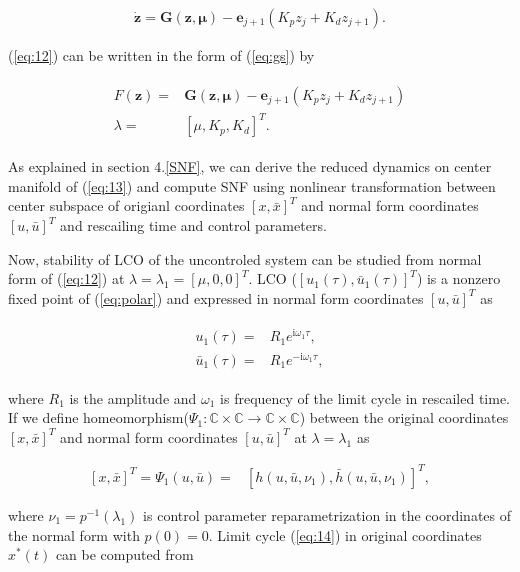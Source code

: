 \documentclass[openacc]{rsproca_new}%
\def\complex{\mathbb{C}}
\def\vec#1{\ensuremath{\mathbf{#1}}}
\newcommand{\Eref}[1]{(\ref{#1})}
\begin{document}
\begin{align}\label{eq:12}
    \dot{\vec{z}} =\vec{G}(\vec{z},\vec{\mu})-\vec{e}_{j+1}(K_p z_j+K_d z_{j+1}).
\end{align}

\noindent \Eref{eq:12} can be written in the form of \Eref{eq:gs} by

\begin{align}\label{eq:13}
\begin{split}
  F({\vec{z}})=&\vec{G}(\vec{z},\vec{\mu})-\vec{e}_{j+1}(K_pz_j+K_d z_{j+1})\\
  \lambda=&[\mu,K_p,K_d]^T.
\end{split}
\end{align}

\noindent As explained in section 4.\ref{SNF}, we can derive the reduced dynamics on center manifold of \Eref{eq:13} and compute SNF using nonlinear transformation between center subspace of origianl coordinates $[x,\bar x]^T$ and normal form coordinates $[u,\bar u]^T$ and rescailing time and control parameters.

Now, stability of LCO of the uncontroled system can be studied from normal form of \Eref{eq:12} at $\lambda=\lambda_1=[\mu,0,0]^T$. LCO ($[u_1(\tau),\bar u_1(\tau)]^T$) is a nonzero fixed point of \Eref{eq:polar} and expressed in normal form coordinates $[u,\bar u]^T$ as

\begin{align}\label{eq:14}
  \begin{split}
      u_1(\tau)=&R_1e^{\textrm{i}\omega_1 \tau},\\
      \bar u_1(\tau)=&R_1e^{-\textrm{i}\omega_1 \tau},
    \end{split}
\end{align}

\noindent where $R_1$ is the amplitude and $\omega_1$ is frequency of the limit cycle in rescailed time. If we define homeomorphism($\Psi_1:\complex\times\complex\rightarrow\complex\times\complex$) between the original coordinates $[x,\bar x]^T$ and normal form coordinates $[u,\bar u]^T$ at $\lambda=\lambda_1$ as

\begin{align}\label{eq:15}
    [x,\bar x]^T=\Psi_1(u,\bar u)=&[h(u,\bar u,\nu_1),\bar h(u,\bar u,\nu_1)]^T,
\end{align}

\noindent  where $\nu_1=p^{-1}(\lambda_1)$ is control parameter reparametrization in the coordinates of the normal form with $p(0)=0$. Limit cycle \Eref{eq:14} in original coordinates $x^*(t)$ can be computed from
\end{document}

